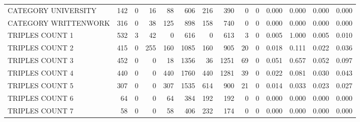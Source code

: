 \begin{tabular}{lrrrrrrrrrllll}
 CATEGORY UNIVERSITY      &             142 &             0 &              16 &              88 &             606 &  216 &  390 &    0 &    0 & 0.000 & 0.000 & 0.000 & 0.000 \\
 CATEGORY WRITTENWORK     &             316 &             0 &              38 &             125 &             898 &  158 &  740 &    0 &    0 & 0.000 & 0.000 & 0.000 & 0.000 \\
 TRIPLES COUNT 1          &             532 &             3 &              42 &               0 &             616 &    0 &  613 &    3 &    0 & 0.005 & 1.000 & 0.005 & 0.010 \\
 TRIPLES COUNT 2          &             415 &             0 &             255 &             160 &            1085 &  160 &  905 &   20 &    0 & 0.018 & 0.111 & 0.022 & 0.036 \\
 TRIPLES COUNT 3          &             452 &             0 &               0 &              18 &            1356 &   36 & 1251 &   69 &    0 & 0.051 & 0.657 & 0.052 & 0.097 \\
 TRIPLES COUNT 4          &             440 &             0 &               0 &             440 &            1760 &  440 & 1281 &   39 &    0 & 0.022 & 0.081 & 0.030 & 0.043 \\
 TRIPLES COUNT 5          &             307 &             0 &               0 &             307 &            1535 &  614 &  900 &   21 &    0 & 0.014 & 0.033 & 0.023 & 0.027 \\
 TRIPLES COUNT 6          &              64 &             0 &               0 &              64 &             384 &  192 &  192 &    0 &    0 & 0.000 & 0.000 & 0.000 & 0.000 \\
 TRIPLES COUNT 7          &              58 &             0 &               0 &              58 &             406 &  232 &  174 &    0 &    0 & 0.000 & 0.000 & 0.000 & 0.000 \\
\hline
\end{tabular}